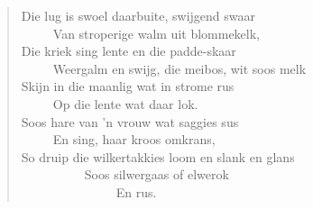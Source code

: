 \begin{verse}
Die lug is swoel daarbuite, swijgend swaar \\ 
\ \ \ \ \ Van stroperige walm uit blommekelk, \\ 
Die kriek sing lente en die padde-skaar \\ 
\ \ \ \ \ Weergalm en swijg, die meibos, wit soos melk \\ 
Skijn in die maanlig wat in strome rus \\ 
\ \ \ \ \ Op die lente wat daar lok. \\ 
Soos hare van ’n vrouw wat saggies sus \\ 
\ \ \ \ \ En sing, haar kroos omkrans, \\ 
So druip die wilkertakkies loom en slank en glans \\ 
\ \ \ \ \ \ \ \ \ \ Soos silwergaas of elwerok \\ 
\ \ \ \ \ \ \ \ \ \ \ \ \ \ \ En rus.
\end{verse}